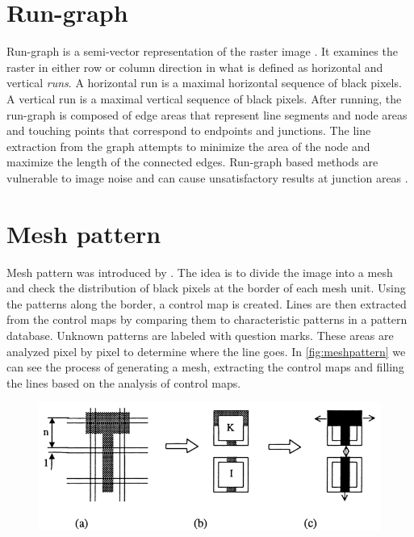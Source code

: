 \section{Run-graph}
Run-graph is a semi-vector representation of the raster image \citet{Monagan1993}. It examines the raster in either row or column direction in what is defined as horizontal and vertical \emph{runs}. A horizontal run is a maximal horizontal sequence of black pixels. A vertical run is a maximal vertical sequence of black pixels. After running, the run-graph is composed of edge areas that represent line segments and node areas and touching points that correspond to endpoints and junctions. The line extraction from the graph attempts to minimize the area of the node and maximize the length of the connected edges. Run-graph based methods are vulnerable to image noise and can cause unsatisfactory results at junction areas \citet{Karabork2008}.

\section{Mesh pattern}
Mesh pattern was introduced by \citet{Lin1985}. The idea is to divide the image into a mesh and check the distribution of black pixels at the border of each mesh unit. Using the patterns along the border, a control map is created. Lines are then extracted from the control maps by comparing them to characteristic patterns in a pattern database. Unknown patterns are labeled with question marks. These areas are analyzed pixel by pixel to determine where the line goes. In \autoref{fig:meshpattern} we can see the process of generating a mesh, extracting the control maps and filling the lines based on the analysis of control maps. 

\begin{figure}[H]
	\centering
	\includegraphics[width=0.8\linewidth]{fig/meshpattern.png}
	\label{fig:meshpattern}
\end{figure}


